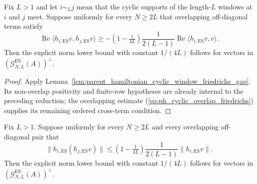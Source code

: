 \begin{lemma}
    \label{lem:parent_hamiltonian_cyclic_overlap_friedrichs_gap}
    \leanok
    Fix $L>1$ and let $i\sim_L j$ mean that the cyclic supports of the
    length-$L$ windows at $i$ and $j$ meet. Suppose uniformly for every
    $N\ge2L$ that overlapping off-diagonal terms satisfy
    \begin{equation}\label{eq:ph_cyclic_overlap_friedrichs}
        \operatorname{Re}\langle h_{i,\mathrm{ES}}v,h_{j,\mathrm{ES}}v\rangle
        \ge -(1-\tfrac{1}{4L})\frac{1}{2(L-1)}
        \operatorname{Re}\langle h_{i,\mathrm{ES}}v,v\rangle.
    \end{equation}
    Then the explicit norm lower bound with constant $1/(4L)$ follows for
    vectors in $(\mathcal G_{N,L}^{\mathrm{ES}}(A))^\perp$.
\end{lemma}

\begin{proof}
    \leanok
    Apply Lemma~\ref{lem:parent_hamiltonian_cyclic_window_friedrichs_gap}.
    Its non-overlap positivity and finite-row hypotheses are already internal to
    the preceding reduction; the overlapping estimate
    (\ref{eq:ph_cyclic_overlap_friedrichs}) supplies its remaining ordered
    cross-term condition.
\end{proof}

\begin{lemma}
    \label{lem:parent_hamiltonian_cyclic_overlap_norm_gap}
    \leanok
    Fix $L>1$. Suppose uniformly for every $N\ge2L$ and every overlapping
    off-diagonal pair that
    \[
        \|h_{i,\mathrm{ES}}(h_{j,\mathrm{ES}}v)\|
        \le (1-\tfrac{1}{4L})\frac{1}{2(L-1)}
        \|h_{i,\mathrm{ES}}v\|.
    \]
    Then the explicit norm lower bound with constant $1/(4L)$ follows for
    vectors in $(\mathcal G_{N,L}^{\mathrm{ES}}(A))^\perp$.
\end{lemma}

